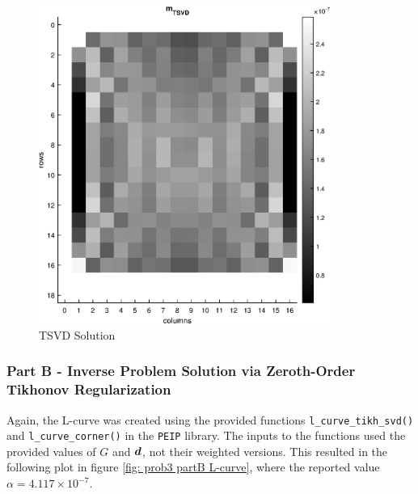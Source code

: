   \begin{figure}[h] 
 	\centering
 	\includegraphics[width=0.85\textwidth]{./images/prob3_partA_m_tsvd.eps}
 	\caption{TSVD Solution}
 	\label{fig: prob3 partA model}
 \end{figure}
 \FloatBarrier
 
 
 \subsubsection{Part B - Inverse Problem Solution via Zeroth-Order Tikhonov Regularization}
 
 Again, the L-curve was created using the provided functions \verb*|l_curve_tikh_svd()| and \verb*|l_curve_corner()| in the \verb*|PEIP| library. The inputs to the functions used the provided values of $G$ and $\boldsymbol{d}$, not their weighted versions. This resulted in the following plot in figure \ref{fig: prob3 partB L-curve}, where the reported value $\alpha = 4.117 \times 10^{-7}$.
 
